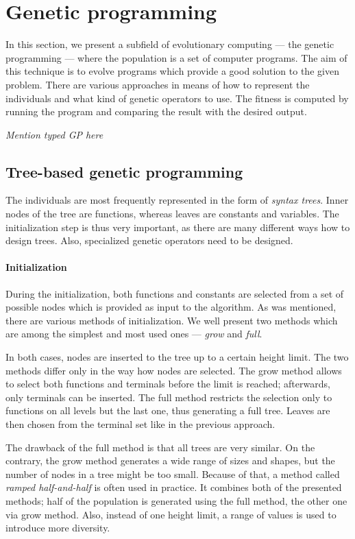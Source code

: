 \section{Genetic programming}
In this section, we present a subfield of evolutionary computing --- 
the genetic programming --- where the population is a set of computer 
programs. The aim of this technique is to evolve programs which provide 
a good solution to the given problem. There are various approaches in means 
of how to represent the individuals and what kind of genetic operators to 
use. The fitness is computed by running the program and comparing the result 
with the desired output. \cite{Poli:2008:FGG:1796422}

\textit{Mention typed GP here}
\subsection{Tree-based genetic programming}
The individuals are most frequently represented in the form of 
\emph{syntax trees}. Inner nodes of the tree are functions, whereas leaves 
are constants and variables. The initialization step is thus very important, as
there are many different ways how to design trees. Also, specialized genetic
operators need to be designed.

\paragraph{Initialization}
During the initialization, both functions and constants are selected from a set
of possible nodes which is provided as input to the algorithm. As was mentioned,
there are various methods of initialization. We well present two methods which
are among the simplest and most used ones --- \emph{grow} and \emph{full}.

In both cases, nodes are inserted to the tree up to a certain height limit.
The two methods differ only in the way how nodes are selected. The grow method
allows to select both functions and terminals before the limit is reached;
afterwards, only terminals can be inserted. The full method restricts the
selection only to functions on all levels but the last one, thus generating 
a full tree. Leaves are then
chosen from the terminal set like in the previous approach.

The drawback of the full method is that all trees are very similar. On the
contrary, the grow method generates a wide range of sizes and shapes, but the
number of nodes in a tree might be too small. Because of that, a method called
\emph{ramped half-and-half} is often used in practice. It combines both 
of the presented methods; half of the population is generated using the full
method, the other one via grow method. Also, instead of one height limit, a
range of values is used to introduce more diversity.

